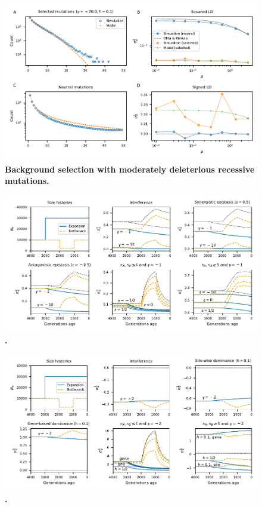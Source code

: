 \documentclass[]{article}
\begin{document}
\begin{figure}[ht!]
    \centering
    \includegraphics{../figures/bgs_gamma_-20.0_h_0.1_n_80}
    \caption{
        \textbf{Background selection with moderately deleterious recessive mutations.}
    }
    \label{fig:bgs4}
\end{figure}

\begin{figure}[ht!]
    \centering
    \includegraphics{../figures/demog_bottle_expand.sd2}
    \caption{
        \textbf{.}
    }
    \label{fig:toy_sd2}
\end{figure}

\begin{figure}[ht!]
    \centering
    \includegraphics{../figures/demog_bottle_expand.dominance}
    \caption{
        \textbf{.}
    }
    \label{fig:toy_dom}
\end{figure}
\end{document}
